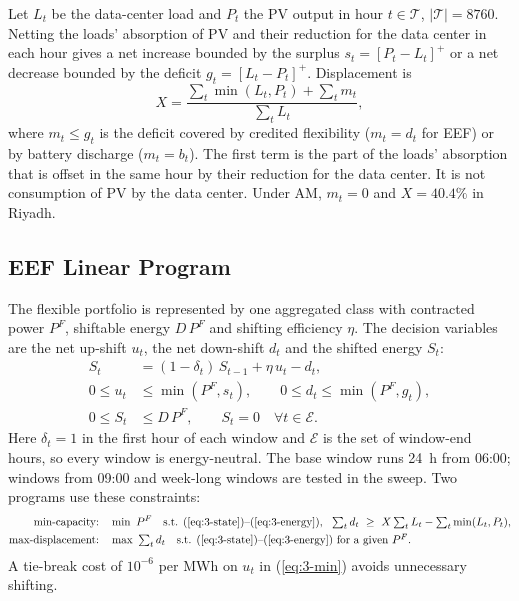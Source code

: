 Let $L_t$ be the data-center load and $P_t$ the PV output in hour $t\in\mathcal{T}$, $|\mathcal{T}|=8760$. Netting the loads' absorption of PV and their reduction for the data center in each hour gives a net increase bounded by the surplus $s_t=[P_t-L_t]^+$ or a net decrease bounded by the deficit $g_t=[L_t-P_t]^+$. Displacement is
\begin{equation}
X=\frac{\sum_t \min(L_t,P_t)+\sum_t m_t}{\sum_t L_t},
\label{eq:3-cfe}
\end{equation}
where $m_t\le g_t$ is the deficit covered by credited flexibility ($m_t=d_t$ for EEF) or by battery discharge ($m_t=b_t$). The first term is the part of the loads' absorption that is offset in the same hour by their reduction for the data center. It is not consumption of PV by the data center. Under AM, $m_t=0$ and $X=40.4\%$ in Riyadh.

\subsection{EEF Linear Program}

The flexible portfolio is represented by one aggregated class with contracted power $P^F$, shiftable energy $D\,P^F$ and shifting efficiency $\eta$. The decision variables are the net up-shift $u_t$, the net down-shift $d_t$ and the shifted energy $S_t$:
\begin{align}
S_t &= (1-\delta_t)\,S_{t-1}+\eta\,u_t-d_t, \label{eq:3-state}\\
0\le u_t &\le \min(P^F,s_t),\qquad 0\le d_t\le\min(P^F,g_t), \label{eq:3-bounds}\\
0\le S_t &\le D\,P^F,\qquad S_t=0\quad \forall t\in\mathcal{E}. \label{eq:3-energy}
\end{align}
Here $\delta_t=1$ in the first hour of each window and $\mathcal{E}$ is the set of window-end hours, so every window is energy-neutral. The base window runs 24~h from 06:00; windows from 09:00 and week-long windows are tested in the sweep. Two programs use these constraints:
\begin{align}
\text{min-capacity:}\quad &\min\ P^F\quad\text{s.t. (\ref{eq:3-state})--(\ref{eq:3-energy})},\ \ \textstyle\sum_t d_t\ \ge\ X\sum_t L_t-\sum_t\min(L_t,P_t), \label{eq:3-min}\\
\text{max-displacement:}\quad &\max\ \textstyle\sum_t d_t\quad\text{s.t. (\ref{eq:3-state})--(\ref{eq:3-energy}) for a given } P^F. \label{eq:3-max}
\end{align}
A tie-break cost of $10^{-6}$ per MWh on $u_t$ in (\ref{eq:3-min}) avoids unnecessary shifting.

